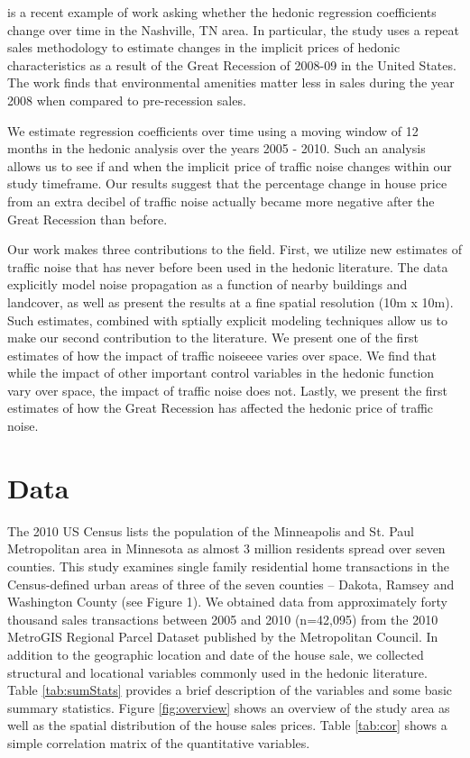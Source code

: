 \documentclass{article}\usepackage{graphicx, color}
\begin{document}
\citet{Cho2011b} is a recent example of work asking whether the hedonic regression coefficients change over time in the Nashville, TN area. In particular, the study uses a repeat sales methodology to estimate changes in the implicit prices of hedonic characteristics as a result of the Great Recession of 2008-09 in the United States. The work finds that environmental amenities matter less in sales during the year 2008 when compared to pre-recession sales.

We estimate regression coefficients over time using a moving window of 12 months in the hedonic analysis over the years 2005 - 2010. Such an analysis allows us to see if and when the implicit price of traffic noise changes within our study timeframe. Our results suggest that the percentage change in house price from an extra decibel of traffic noise actually became more negative after the Great Recession than before. 

Our work makes three contributions to the field. First, we utilize new estimates of traffic noise that has never before been used in the hedonic literature. The data explicitly model noise propagation as a function of nearby buildings and landcover, as well as present the results at a fine spatial resolution (10m x 10m). Such estimates, combined with sptially explicit modeling techniques allow us to make our second contribution to the literature. We present one of the first estimates of how the impact of traffic noiseeee varies over space. We find that while the impact of other important control variables in the hedonic function vary over space, the impact of traffic noise does not. Lastly, we present the first estimates of how the Great Recession has affected the hedonic price of traffic noise.

\section{Data}
The 2010 US Census lists the population of the Minneapolis and St. Paul Metropolitan area in Minnesota as almost 3 million residents spread over seven counties. This study examines single family residential home transactions in the Census-defined urban areas of three of the seven counties – Dakota, Ramsey and Washington County (see Figure 1). We obtained data from approximately forty thousand sales transactions between 2005 and 2010 (n=42,095) from the 2010 MetroGIS Regional Parcel Dataset published by the Metropolitan Council. In addition to the geographic location and date of the house sale, we collected structural and locational variables commonly used in the hedonic literature. Table \ref{tab:sumStats} provides a brief description of the variables and some basic summary statistics. Figure \ref{fig:overview} shows an overview of the study area as well as the spatial distribution of the house sales prices. Table \ref{tab:cor} shows a simple correlation matrix of the quantitative variables.
\end{document}

